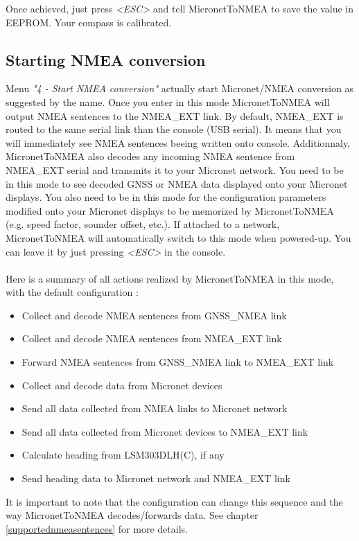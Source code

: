 \documentclass{report}
\begin{document}
Once achieved, just press \emph{<ESC>} and tell MicronetToNMEA to save the value in EEPROM. Your compass is calibrated.

\subsection{Starting NMEA conversion}

Menu \emph{"4 - Start NMEA conversion"} actually start Micronet/NMEA conversion as suggested by the name. Once you enter in this mode MicronetToNMEA will output NMEA sentences to the NMEA\_EXT link. By default, NMEA\_EXT is routed to the same serial link than the console (USB serial). It means that you will immediately see NMEA sentences beeing written onto console. Additionnaly, MicronetToNMEA also decodes any incoming NMEA sentence from NMEA\_EXT serial and transmits it to your Micronet network.
You need to be in this mode to see decoded GNSS or NMEA data displayed onto your Micronet displays. You also need to be in this mode for the configuration parameters modified onto your Micronet displays to be memorized by MicronetToNMEA (e.g. speed factor, sounder offset, etc.).
If attached to a network, MicronetToNMEA will automatically switch to this mode when powered-up. You can leave it by just pressing \emph{<ESC>} in the console.
\\
\\
Here is a summary of all actions realized by MicronetToNMEA in this mode, with the default configuration :
\begin{itemize}
	\item Collect and decode NMEA sentences from GNSS\_NMEA link
	\item Collect and decode NMEA sentences from NMEA\_EXT link
	\item Forward NMEA sentences from GNSS\_NMEA link to NMEA\_EXT link
	\item Collect and decode data from Micronet devices
	\item Send all data collected from NMEA links to Micronet network
	\item Send all data collected from Micronet devices to NMEA\_EXT link
	\item Calculate heading from LSM303DLH(C), if any
	\item Send heading data to Micronet network and NMEA\_EXT link
\end{itemize}

It is important to note that the configuration can change this sequence and the way MicronetToNMEA decodes/forwards data. See chapter {\ref{supportednmeasentences}} for more details.
\end{document}

